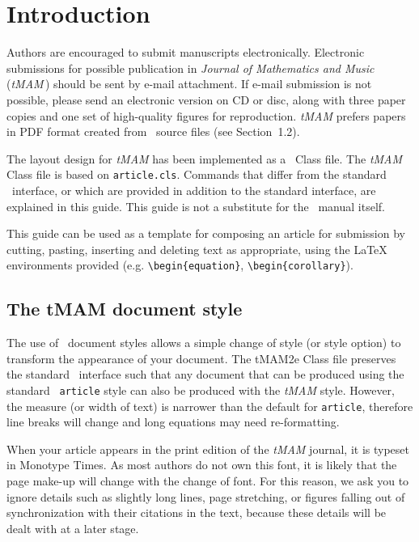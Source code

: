 \documentclass[]{tMAM2e}
\begin{document}
\section{Introduction}

Authors are encouraged to submit manuscripts electronically. Electronic submissions for possible publication in  {\itshape Journal of Mathematics and Music} ({\it tMAM}\,) should be sent by e-mail attachment. If e-mail submission is not possible, please send an electronic version on CD or disc, along with three paper copies and one set of high-quality figures for reproduction. {\it tMAM} prefers papers in PDF format created from \LaTeXe\ source files (see Section~1.2).

The layout design for {\it tMAM} has been implemented as a \LaTeXe\ Class file. The {\it tMAM} Class file is
based on {\tt article.cls}. Commands that differ from the standard \LaTeXe\ interface, or which are provided in
addition to the standard interface, are explained in this guide. This guide is not a substitute for the \LaTeXe\
manual itself.

This guide can be used as a template for composing an article for submission by cutting, pasting, inserting and
deleting text as appropriate, using the LaTeX environments provided (e.g. \verb"\begin{equation}",
\verb"\begin{corollary}"). \vspace{6pt}


\subsection{The {\bi tMAM} document style}

The use of \LaTeXe\ document styles allows a simple change of style (or style option) to transform the appearance
of your document. The tMAM2e Class file preserves the standard \LaTeXe\ interface such that any document that can
be produced using the standard \LaTeXe\ {\tt article} style can also be produced with the {\it tMAM} style.
However, the measure (or width of text) is narrower than the default for {\tt article}, therefore line breaks
will change and long equations may need re-formatting.

When your article appears in the print edition of the {\it tMAM} journal, it is typeset in Monotype Times. As
most authors do not own this font, it is likely that the page make-up will change with the change of font. For
this reason, we ask you to ignore details such as slightly long lines, page stretching, or figures falling out of
synchronization with their citations in the text, because these details will be dealt with at a later stage.
\end{document}
